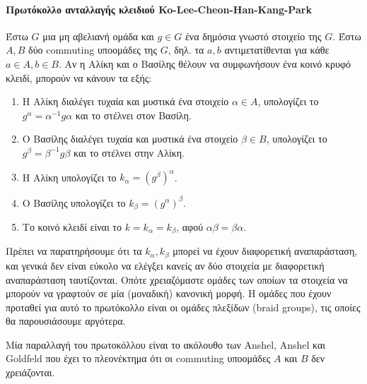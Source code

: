 \paragraph*{Πρωτόκολλο ανταλλαγής κλειδιού Ko-Lee-Cheon-Han-Kang-Park \cite{ko}} Έστω $ G $ μια μη αβελιανή ομάδα και $ g \in G $ ένα δημόσια γνωστό στοιχείο της $ G $. Έστω $ A,B $ δύο commuting υποομάδες της $ G $,
δηλ. τα $a,b$ αντιμετατίθενται για κάθε $ a \in A, b \in B $. Αν η Αλίκη και ο Βασίλης θέλουν να συμφωνήσουν ένα κοινό κρυφό κλειδί, μπορούν να κάνουν τα εξής:
\begin{enumerate}
\item Η Αλίκη διαλέγει τυχαία και μυστικά ένα στοιχείο $ \alpha \in A $, υπολογίζει το $ g^\alpha = \alpha^{-1} g \alpha $ και το στέλνει στον Βασίλη.
\item Ο Βασίλης διαλέγει τυχαία και μυστικά ένα στοιχείο $ \beta \in B $, υπολογίζει το $ g^\beta = \beta^{-1} g \beta $ και το στέλνει στην Αλίκη.
\item Η Αλίκη υπολογίζει το $ k_\alpha = \left( g^\beta\right)^\alpha $.
\item Ο Βασίλης υπολογίζει το $ k_\beta = \left( g^\alpha\right)^\beta $.
\item Το κοινό κλειδί είναι το $ k = k_\alpha = k_\beta $, αφού $\alpha\beta=\beta\alpha$.
\end{enumerate}

Πρέπει να παρατηρήσουμε ότι τα $k_{\alpha},k_{\beta}$ μπορεί να έχουν διαφορετική αναπαράσταση, και γενικά δεν είναι εύκολο να ελέγξει κανείς αν δύο στοιχεία με διαφορετική αναπαράσταση ταυτίζονται. Οπότε χρειαζόμαστε ομάδες των οποίων τα στοιχεία να μπορούν να γραφτούν σε μία (μοναδική) κανονική μορφή. Η ομάδες που έχουν προταθεί για αυτό το πρωτόκολλο είναι οι ομάδες πλεξίδων (braid groups), τις οποίες θα παρουσιάσουμε αργότερα.

Μία παραλλαγή του πρωτοκόλλου  είναι το ακόλουθο των Anshel, Anshel και Goldfeld που έχει το πλεονέκτημα ότι οι commuting υποομάδες $ A $ και $ B $ δεν χρειάζονται.

